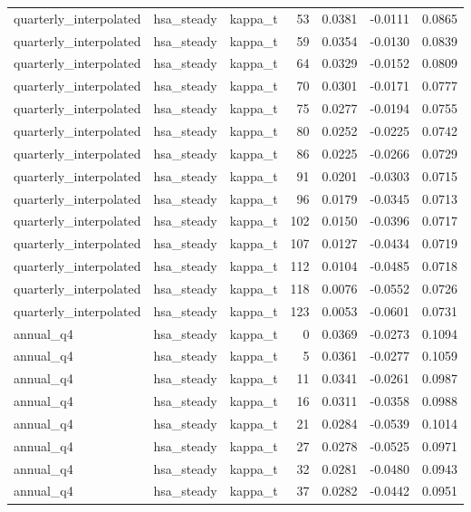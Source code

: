 \begin{tabular}{lllrrrr}
quarterly\_interpolated & hsa\_steady & kappa\_t & 53 & 0.0381 & -0.0111 & 0.0865 \\
quarterly\_interpolated & hsa\_steady & kappa\_t & 59 & 0.0354 & -0.0130 & 0.0839 \\
quarterly\_interpolated & hsa\_steady & kappa\_t & 64 & 0.0329 & -0.0152 & 0.0809 \\
quarterly\_interpolated & hsa\_steady & kappa\_t & 70 & 0.0301 & -0.0171 & 0.0777 \\
quarterly\_interpolated & hsa\_steady & kappa\_t & 75 & 0.0277 & -0.0194 & 0.0755 \\
quarterly\_interpolated & hsa\_steady & kappa\_t & 80 & 0.0252 & -0.0225 & 0.0742 \\
quarterly\_interpolated & hsa\_steady & kappa\_t & 86 & 0.0225 & -0.0266 & 0.0729 \\
quarterly\_interpolated & hsa\_steady & kappa\_t & 91 & 0.0201 & -0.0303 & 0.0715 \\
quarterly\_interpolated & hsa\_steady & kappa\_t & 96 & 0.0179 & -0.0345 & 0.0713 \\
quarterly\_interpolated & hsa\_steady & kappa\_t & 102 & 0.0150 & -0.0396 & 0.0717 \\
quarterly\_interpolated & hsa\_steady & kappa\_t & 107 & 0.0127 & -0.0434 & 0.0719 \\
quarterly\_interpolated & hsa\_steady & kappa\_t & 112 & 0.0104 & -0.0485 & 0.0718 \\
quarterly\_interpolated & hsa\_steady & kappa\_t & 118 & 0.0076 & -0.0552 & 0.0726 \\
quarterly\_interpolated & hsa\_steady & kappa\_t & 123 & 0.0053 & -0.0601 & 0.0731 \\
annual\_q4 & hsa\_steady & kappa\_t & 0 & 0.0369 & -0.0273 & 0.1094 \\
annual\_q4 & hsa\_steady & kappa\_t & 5 & 0.0361 & -0.0277 & 0.1059 \\
annual\_q4 & hsa\_steady & kappa\_t & 11 & 0.0341 & -0.0261 & 0.0987 \\
annual\_q4 & hsa\_steady & kappa\_t & 16 & 0.0311 & -0.0358 & 0.0988 \\
annual\_q4 & hsa\_steady & kappa\_t & 21 & 0.0284 & -0.0539 & 0.1014 \\
annual\_q4 & hsa\_steady & kappa\_t & 27 & 0.0278 & -0.0525 & 0.0971 \\
annual\_q4 & hsa\_steady & kappa\_t & 32 & 0.0281 & -0.0480 & 0.0943 \\
annual\_q4 & hsa\_steady & kappa\_t & 37 & 0.0282 & -0.0442 & 0.0951 \\

\end{tabular}
